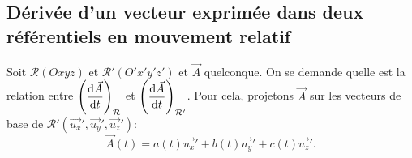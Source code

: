     \subsection{Dérivée d'un vecteur exprimée dans deux référentiels en mouvement relatif}

        Soit $\mathcal{R}(Oxyz)$ et $\mathcal{R}'(O'x'y'z')$ et $\vec{A}$ quelconque. On se demande quelle est la relation entre $\left(\dfrac{\mathrm{d}\vec{A}}{\mathrm{d} t}\right)_{\mathcal{R}}$ et $\left(\dfrac{\mathrm{d}\vec{A}}{\mathrm{d} t}\right)_{\mathcal{R}'}$. Pour cela, projetons $\vec{A}$ sur les vecteurs de base de $\mathcal{R}'(\vec{u_x}',\vec{u_y}',\vec{u_z}')$:
        \begin{equation*}
            \vec{A}(t) = a(t)\vec{u_x}'+b(t)\vec{u_y}'+c(t)\vec{u_z}'.
        \end{equation*}

